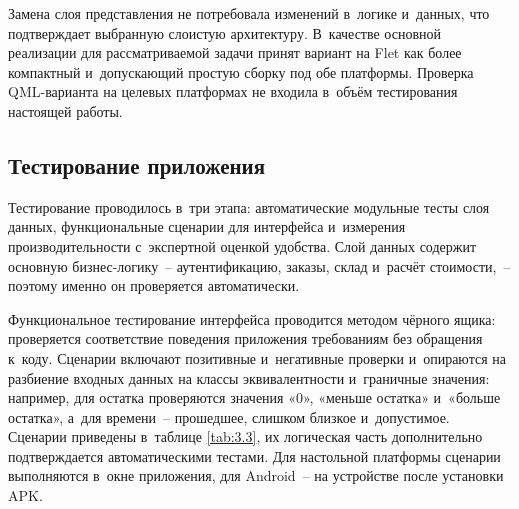 \documentclass[14pt,a4paper]{extarticle}
\begin{document}
Замена слоя представления не потребовала изменений в~логике и~данных, что подтверждает выбранную слоистую архитектуру. В~качестве основной реализации для рассматриваемой задачи принят вариант на Flet как более компактный и~допускающий простую сборку под обе платформы. Проверка QML-варианта на целевых платформах не входила в~объём тестирования настоящей работы.



\subsection{Тестирование приложения}

Тестирование проводилось в~три этапа: автоматические модульные тесты слоя данных, функциональные сценарии для интерфейса и~измерения производительности с~экспертной оценкой удобства. Слой данных содержит основную бизнес-логику~– аутентификацию, заказы, склад и~расчёт стоимости,~– поэтому именно он проверяется автоматически.



Функциональное тестирование интерфейса проводится методом чёрного ящика: проверяется соответствие поведения приложения требованиям без обращения к~коду. Сценарии включают позитивные и~негативные проверки и~опираются на разбиение входных данных на классы эквивалентности и~граничные значения: например, для остатка проверяются значения «0», «меньше остатка» и~«больше остатка», а~для времени~– прошедшее, слишком близкое и~допустимое. Сценарии приведены в~таблице \ref{tab:3.3}, их логическая часть дополнительно подтверждается автоматическими тестами. Для настольной платформы сценарии выполняются в~окне приложения, для Android~– на устройстве после установки APK.
\end{document}
